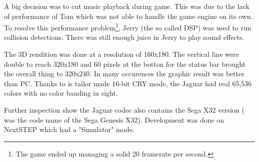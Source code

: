 \par
{}
\par
A big decision was to cut music playback during game. This was due to the lack of performance of Tom which was not able to handle the game engine on its own. To resolve this performance problem\footnote{The game ended up managing a solid 20 framerate per second.}, Jerry (the so called DSP) was used to run collision detections. There was still enough juice in Jerry to play sound effects.\\
\par
The 3D rendition was done at a resolution of 160x180. The vertical line were double to reach 320x180 and 60 pixels at the botton for the status bar brought the overall thing to 320x240. In many occurences the graphic result was better than PC. Thanks to is tailor made 16-bit CRY mode, the Jaguar had real 65,536 colors with no color banding in sight.\\
\par
{}
\par
Further inspection show the Jaguar codee also contains the Sega X32 version ( was the code name of the Sega Genesis X32). Development was done on NextSTEP which had a "Simulator" mode.\\
\par
{}
\par


